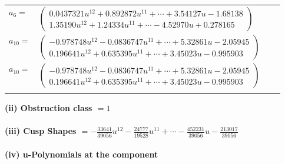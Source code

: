 \documentclass[1p]{elsarticle_modified}
\theoremstyle{definition}
\begin{document}
\begin{tabular}{m{7pt} m{180pt} m{7pt} m{180pt} }
\flushright $a_{6}=$&$\begin{pmatrix}0.0437321 u^{12}+0.892872 u^{11}+\cdots+3.54127 u-1.68138\\1.35190 u^{12}+1.24334 u^{11}+\cdots-4.52970 u+0.278165\end{pmatrix}$ \\
\flushright $a_{10}=$&$\begin{pmatrix}-0.978748 u^{12}-0.0836747 u^{11}+\cdots+5.32861 u-2.05945\\0.196641 u^{12}+0.635395 u^{11}+\cdots+3.45023 u-0.995903\end{pmatrix}$\\ \flushright $a_{10}=$&$\begin{pmatrix}-0.978748 u^{12}-0.0836747 u^{11}+\cdots+5.32861 u-2.05945\\0.196641 u^{12}+0.635395 u^{11}+\cdots+3.45023 u-0.995903\end{pmatrix}$\\&\end{tabular}
\flushleft \textbf{(ii) Obstruction class $= 1$}\\~\\
\flushleft \textbf{(iii) Cusp Shapes $= -\frac{33641}{39056} u^{12}-\frac{24777}{19528} u^{11}+\cdots-\frac{452231}{39056} u-\frac{213017}{39056}$}\\~\\
\newpage\renewcommand{\arraystretch}{1}
\flushleft \textbf{(iv) u-Polynomials at the component}\newline \\
\end{document}
